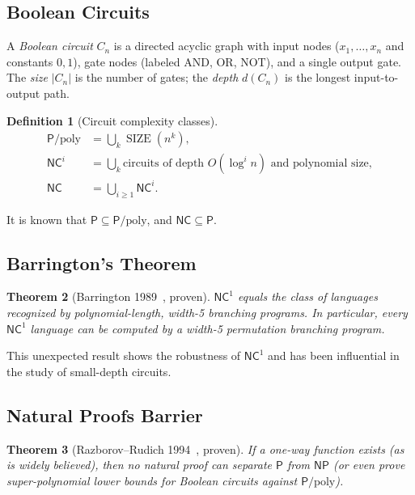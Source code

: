 \documentclass[12pt,a4paper]{amsart}
\newtheorem{theorem}{Theorem}[section]
\theoremstyle{definition}
\newtheorem{definition}[theorem]{Definition}
\newcommand{\Pclass}{\mathsf{P}}
\newcommand{\NP}{\mathsf{NP}}
\newcommand{\NC}{\mathsf{NC}}
\DeclareMathOperator{\SIZE}{SIZE}
\begin{document}
\subsection{Boolean Circuits}

A \emph{Boolean circuit} $C_n$ is a directed acyclic graph with input nodes
($x_1,\ldots,x_n$ and constants $0,1$), gate nodes (labeled AND, OR, NOT), and
a single output gate.  The \emph{size} $|C_n|$ is the number of gates; the
\emph{depth} $d(C_n)$ is the longest input-to-output path.

\begin{definition}[Circuit complexity classes]
\begin{align*}
  \Pclass/\mathrm{poly} &= \bigcup_{k}\SIZE(n^k), \\
  \NC^i &= \bigcup_{k}\text{circuits of depth }O(\log^i n)\text{ and polynomial size},\\
  \NC &= \bigcup_{i\geq 1}\NC^i.
\end{align*}
\end{definition}

It is known that $\Pclass\subseteq\Pclass/\mathrm{poly}$, and
$\NC\subseteq\Pclass$.

\subsection{Barrington's Theorem}

\begin{theorem}[Barrington 1989~\cite{barrington1989}, proven]
$\NC^1$ equals the class of languages recognized by polynomial-length,
width-5 branching programs.  In particular, every $\NC^1$ language can be
computed by a width-5 permutation branching program.
\end{theorem}

This unexpected result shows the robustness of $\NC^1$ and has been influential
in the study of small-depth circuits.

\subsection{Natural Proofs Barrier}

\begin{theorem}[Razborov--Rudich 1994~\cite{razborov1994}, proven]
If a one-way function exists (as is widely believed), then no \emph{natural
proof} can separate $\Pclass$ from $\NP$ (or even prove super-polynomial lower
bounds for Boolean circuits against $\Pclass/\mathrm{poly}$).
\end{theorem}
\end{document}
